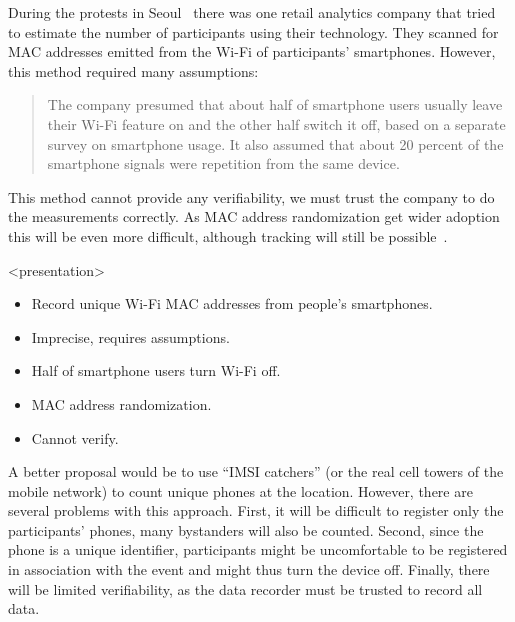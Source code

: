 During the protests in Seoul~\cite{2016DemonstrationsInSeoul} there was one 
retail analytics company that tried to estimate the number of participants 
using their technology.
They scanned for MAC addresses emitted from the Wi-Fi of participants' 
smartphones.
However, this method required many assumptions:
\blockcquote{2016DemonstrationsInSeoul}{%
  The company presumed that about half of smartphone users usually leave their 
  Wi-Fi feature on and the other half switch it off, based on a separate survey 
  on smartphone usage. It also assumed that about 20 percent of the smartphone 
  signals were repetition from the same device.
}
This method cannot provide any verifiability, we must trust the company to do 
the measurements correctly.
As MAC address randomization get wider adoption this will be even more 
difficult, although tracking will still be 
possible~\cite{WhyMACRandomizationIsNotEnough}.

\begin{frame}<presentation>
  \begin{solution}[Wi-Fi tracking]
    \begin{itemize}
      \item Record unique Wi-Fi MAC addresses from people's smartphones.
    \end{itemize}
  \end{solution}

  \pause

  \begin{remark}
    \begin{itemize}
      \item Imprecise, requires assumptions.
      \item Half of smartphone users turn Wi-Fi off.
      \item MAC address randomization.
      \item Cannot verify.
    \end{itemize}
  \end{remark}
\end{frame}

A better proposal would be to use \enquote{IMSI catchers} (or the real cell 
towers of the mobile network) to count unique phones at the location.
However, there are several problems with this approach.
First, it will be difficult to register only the participants' phones, many 
bystanders will also be counted.
Second, since the phone is a unique identifier, participants might be 
uncomfortable to be registered in association with the event and might thus 
turn the device off.
Finally, there will be limited verifiability, as the data recorder must be 
trusted to record all data.

